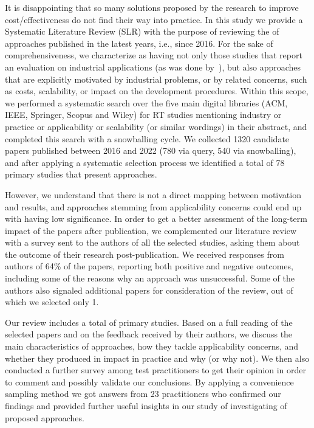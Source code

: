 It is disappointing that so many solutions proposed by the research to improve \rt cost/effectiveness do not find their way into practice.
In this study we provide a Systematic Literature Review (SLR) with the purpose of reviewing the \rea of \rt  approaches published in the latest  years, i.e., since 2016.
For the sake of comprehensiveness, we characterize as having \rea not only those studies that report an evaluation on industrial applications (as was done by~\citet{bin_ali_search_2019}), but also approaches that are explicitly motivated by industrial problems, or by related concerns, such as costs, scalability, or impact on the development procedures. 
Within this scope, we performed a systematic search over the five main digital libraries (ACM, IEEE, Springer, Scopus and Wiley) for RT studies mentioning industry or practice or applicability or scalability (or similar wordings) in their abstract, and completed this search with a snowballing cycle.
We collected 1320 candidate papers published between 2016 and 2022 (780 via query, 540 via snowballing), and after applying a systematic selection process we identified a total of 78 primary studies that present \rea approaches.

However, we understand that there is not a direct mapping between motivation and results, 
and approaches stemming from applicability concerns could end up with having low significance.
In order to get a better assessment of the long-term impact of the papers after publication, we complemented our literature review with a survey sent to the authors of all the selected studies, asking them about the outcome of their research post-publication.
We received responses from authors of 64\% of the papers, reporting both positive and negative outcomes, including some of the reasons why an approach was unsuccessful.
Some of the authors also signaled additional papers for consideration of the review, out of which we selected only 1.

Our review includes a total of \numpapers primary studies. 
Based on a full reading of the selected papers and on the feedback received  by their authors, we discuss the main characteristics of \rea approaches, how they tackle applicability concerns, and whether they produced in impact in practice and why (or why not).
We then also conducted a further survey among test practitioners to get their opinion in order to comment and possibly validate our conclusions.
By applying a convenience sampling method we got answers from 23 practitioners who confirmed our findings and provided further useful insights in our study of investigating \rea of proposed \rt approaches.

